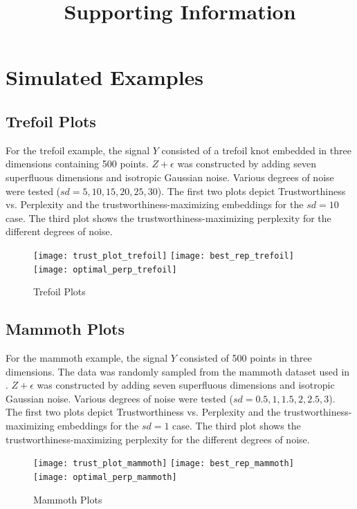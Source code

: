 \documentclass{article}
\title{Supporting Information}
\date{}
\renewcommand{\thesection}{S\Roman{section}}
\renewcommand{\thefigure}{S\arabic{figure}}
\begin{document}
\maketitle

\setcounter{section}{0}
\setcounter{figure}{0}
\renewcommand{\thesection}{S\Roman{section}}
\renewcommand{\thefigure}{S\arabic{figure}}

\section{Simulated Examples}
\subsection{Trefoil Plots}
For the trefoil example, the signal $Y$ consisted of a trefoil knot embedded in three dimensions containing 500 points. $Z + \epsilon$ was constructed by adding seven superfluous dimensions and isotropic Gaussian noise. Various degrees of noise were tested ($sd = 5, 10, 15, 20, 25, 30$). The first two plots depict Trustworthiness vs. Perplexity and the trustworthiness-maximizing embeddings for the $sd = 10$ case. The third plot shows the trustworthiness-maximizing perplexity for the different degrees of noise.

\begin{figure}[H]
\centering
\texttt{[image: trust\_plot\_trefoil]}
\texttt{[image: best\_rep\_trefoil]}
\texttt{[image: optimal\_perp\_trefoil]}
\caption{Trefoil Plots}
\end{figure}

\subsection{Mammoth Plots}
For the mammoth example, the signal $Y$ consisted of 500 points in three dimensions. The data was randomly sampled from the mammoth dataset used in \cite{understanding DR}. $Z + \epsilon$ was constructed by adding seven superfluous dimensions and isotropic Gaussian noise. Various degrees of noise were tested ($sd = 0.5, 1, 1.5, 2, 2.5, 3$). The first two plots depict Trustworthiness vs. Perplexity and the trustworthiness-maximizing embeddings for the $sd = 1$ case. The third plot shows the trustworthiness-maximizing perplexity for the different degrees of noise.
\begin{figure}[H]
\centering
\texttt{[image: trust\_plot\_mammoth]}
\texttt{[image: best\_rep\_mammoth]}
\texttt{[image: optimal\_perp\_mammoth]}
\caption{Mammoth Plots}
\end{figure}
\end{document}
